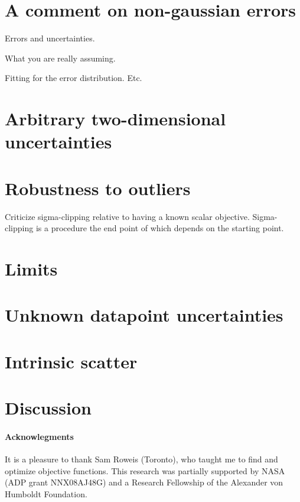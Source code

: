 \documentclass[12pt]{article}
\begin{document}
\section{A comment on non-gaussian errors}

Errors and uncertainties.

What you are really assuming.

Fitting for the error distribution.  Etc.

\section{Arbitrary two-dimensional uncertainties}

\section{Robustness to outliers}

Criticize sigma-clipping relative to having a known scalar objective.
Sigma-clipping is a procedure the end point of which depends on the
starting point.

\section{Limits}

\section{Unknown datapoint uncertainties}

\section{Intrinsic scatter}

\section{Discussion}

\paragraph{Acknowlegments}
It is a pleasure to thank Sam Roweis (Toronto), who taught me to find
and optimize objective functions.  This research was partially
supported by NASA (ADP grant NNX08AJ48G) and a Research Fellowship of
the Alexander von Humboldt Foundation.
\end{document}
